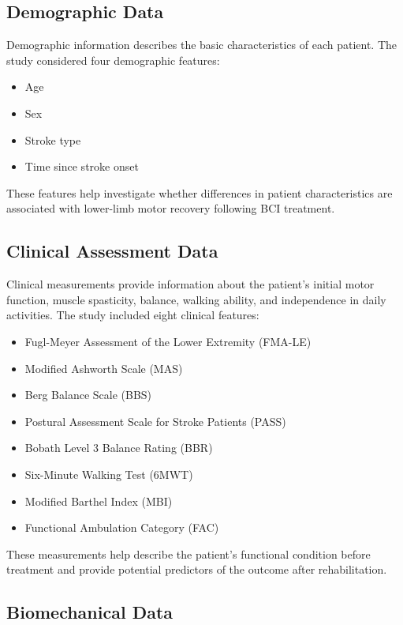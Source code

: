 \subsection{{Demographic Data}}

Demographic information describes the basic characteristics of each patient. The study considered four demographic features:

\begin{itemize}
    \item Age
    \item Sex
    \item Stroke type
    \item Time since stroke onset
\end{itemize}

These features help investigate whether differences in patient characteristics are associated with lower-limb motor recovery following BCI treatment.

\subsection{{Clinical Assessment Data}}

Clinical measurements provide information about the patient's initial motor function, muscle spasticity, balance, walking ability, and independence in daily activities. The study included eight clinical features:

\begin{itemize}
    \item Fugl-Meyer Assessment of the Lower Extremity (FMA-LE)
    \item Modified Ashworth Scale (MAS)
    \item Berg Balance Scale (BBS)
    \item Postural Assessment Scale for Stroke Patients (PASS)
    \item Bobath Level 3 Balance Rating (BBR)
    \item Six-Minute Walking Test (6MWT)
    \item Modified Barthel Index (MBI)
    \item Functional Ambulation Category (FAC)
\end{itemize}

These measurements help describe the patient's functional condition before treatment and provide potential predictors of the outcome after rehabilitation.

\subsection{{Biomechanical Data}}

